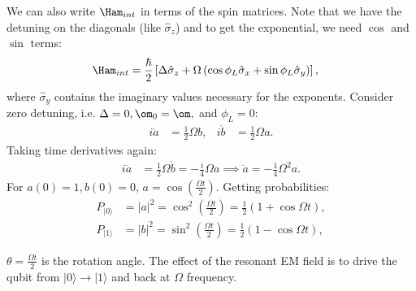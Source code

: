 \documentclass[lasers.tex]{subfiles}
\begin{document}
We can also write $\Ham_{int}$ in terms of the spin matrices. 
Note that we have the detuning on the diagonals (like $\hat{\sigma}_z$) and to get the exponential, we need $\cos$ and $\sin$ terms:
\begin{align}
    \Ham_{int} &= \frac{\hbar}{2}\left[\Delta\hat{\sigma}_z + \Omega\left(\cos\phi_L\hat{\sigma}_x + \sin\phi_L\hat{\sigma}_y\right)\right],
\end{align}
where $\hat{\sigma}_y$ contains the imaginary values necessary for the exponents. 
Consider zero detuning, i.e. $\Delta=0,\om_0=\om,$ and $\phi_L=0$:
\begin{align}
    i\dot{a} &= \frac12 \Omega b, & i\dot{b} &= \frac12\Omega a.
\end{align}
Taking time derivatives again:
\begin{align}
    i\ddot{a} &= \frac12\Omega\dot{b} = -\frac{i}{4}\Omega a \implies \ddot{a} = -\frac14\Omega^2 a.
\end{align}
For $a(0)=1,b(0)=0$, $a=\cos\left(\frac{\Omega t}{2}\right)$.
Getting probabilities:
\begin{align}
    P_{|0\rangle} &= |a|^2 = \cos^2\left(\frac{\Omega t}{2}\right) = \frac12(1+\cos\Omega t), \\
    P_{|1\rangle} &= |b|^2 = \sin^2\left(\frac{\Omega t}{2}\right) = \frac12(1-\cos\Omega t),
\end{align}
\begin{figure}[H]
    \centering
\end{figure}
$\theta=\frac{\Omega t}{2}$ is the rotation angle. 
The effect of the resonant EM field is to drive the qubit from $|0\rangle\to|1\rangle$ and back at $\Omega$ frequency. 
\end{document}

